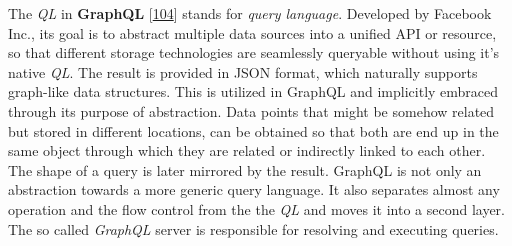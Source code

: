 \documentclass[12pt,english,a4paper,titlepage,cleardoublepage=empty,dottedtoc]{report}
\begin{document}
The \emph{QL} in \textbf{\protect\hypertarget{link-graphql}{}{GraphQL}}
{[}\protect\hyperlink{ref-web_spec_graphql}{104}{]} stands for
\emph{query language}. Developed by Facebook Inc., its goal is to
abstract multiple data sources into a unified API or resource, so that
different storage technologies are seamlessly queryable without using
it's native \emph{QL}. The result is provided in JSON format, which
naturally supports graph-like data structures. This is utilized in
GraphQL and implicitly embraced through its purpose of abstraction. Data
points that might be somehow related but stored in different locations,
can be obtained so that both are end up in the same object through which
they are related or indirectly linked to each other. The shape of a
query is later mirrored by the result. GraphQL is not only an
abstraction towards a more generic query language. It also separates
almost any operation and the flow control from the the \emph{QL} and
moves it into a second layer. The so called \emph{GraphQL} server is
responsible for resolving and executing queries.
\end{document}
